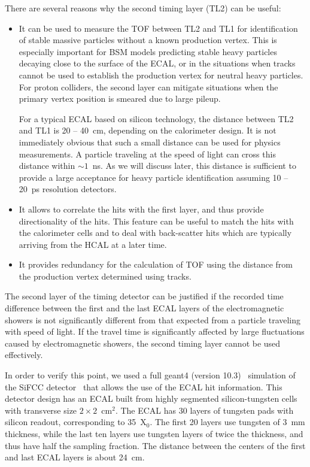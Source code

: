 \documentclass[final,1p,11pt]{elsarticle}
\begin{document}
There are several reasons why the second timing layer (TL2) can be useful:

\begin{itemize}

\item
It can be used to measure the TOF between TL2 and TL1 for identification
of stable massive particles without a known production vertex. This is especially important
for BSM models predicting stable heavy particles
decaying close to the surface of the ECAL, or
in the situations when tracks cannot be used to establish the production vertex for neutral heavy particles.
For proton colliders,  the second layer can mitigate situations when the primary vertex position  
is smeared due to large pileup.


For a typical ECAL based on silicon technology, the distance between TL2 and TL1 is  20 -- 40~cm, depending on the calorimeter design.
It is not immediately obvious that such a small distance can be used for physics measurements. 
A particle traveling at the speed of light can cross this distance within $\sim 1$~ns.
As we will discuss later, this distance is sufficient to provide a large acceptance 
for heavy particle identification  assuming  10 -- 20~ps resolution detectors. 

\item
It allows to correlate the hits with the first layer, and thus provide directionality of the hits. This feature can be useful to
match the hits with the calorimeter cells and to deal with back-scatter hits which are typically arriving from the HCAL at a later time. 

\item
It provides redundancy for the calculation of TOF using the distance from the production vertex determined using tracks.

\end{itemize}

The second layer of the timing detector can be justified if the recorded time difference between the first and the last ECAL  
layers of the electromagnetic showers is not significantly different from that expected from a particle traveling with speed of light.
If the travel time is significantly affected by large fluctuations caused by electromagnetic showers,    
the second timing layer cannot be used effectively.

In order to verify this point, we used a full {\sc geant}4 (version 10.3)~\cite{Allison2016186} simulation 
of the SiFCC detector~\cite{Chekanov:2016ppq} that allows the use of the ECAL hit information.
This detector design has an ECAL built from highly segmented silicon-tungsten cells with transverse size $2 \times 2$~cm$^2$.
The ECAL has 30 layers of tungsten pads with silicon readout,
corresponding to 35~X$_{0}$. The first 20 layers use tungsten of 3~mm thickness, while the last ten layers use tungsten layers of
twice the thickness, and thus have half the  sampling fraction.  
The distance between the centers of the first and last ECAL layers is about 24~cm.  
\end{document}
